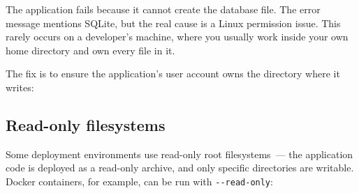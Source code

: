 \begin{codebox}[short]

\begin{Shaded}
\begin{Highlighting}[]

 

\end{Highlighting}
\end{Shaded}

\end{codebox}

\noindent{}The application fails because it cannot create the database file. The error message mentions SQLite, but the real cause is a Linux permission issue. This rarely occurs on a developer's machine, where you usually work inside your own home directory and own every file in it.

The fix is to ensure the application's user account owns the directory where it writes:

\begin{codebox}[short]

\begin{Shaded}
\begin{Highlighting}[]
\end{Highlighting}
\end{Shaded}

\end{codebox}

\subsection*{Read-only filesystems}\label{07-environment-drift:read-only-filesystems}

Some deployment environments use read-only root filesystems~--- the application code is deployed as a read-only archive, and only specific directories are writable. Docker containers, for example, can be run with \texttt{-\/-read-only}:

